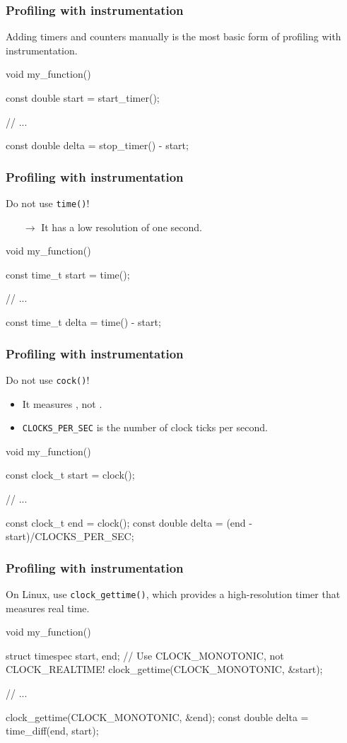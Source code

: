 \documentclass[12pt,t]{beamer}
\let\emph\relax %
\newcommand{\conclude}[1]{%
  \begin{itemize}
    \item[$\rightarrow$]#1
  \end{itemize}
}
\begin{document}
  \begin{frame}[fragile]
    \frametitle{Profiling with instrumentation}

    Adding timers and counters manually is the most basic form of profiling with instrumentation.

    \begin{code}
void my_function()
{
  const double start = start_timer();

  // ...

  const double delta = stop_timer() - start;
}
    \end{code}
  \end{frame}

  \begin{frame}[fragile]
    \frametitle{Profiling with instrumentation}

    Do not use \texttt{time()}!
    \conclude{It has a low resolution of one second.}

    \begin{code}
void my_function()
{
  const time_t start = time();

  // ...

  const time_t delta = time() - start;
}
    \end{code}
  \end{frame}

  \begin{frame}[fragile]
    \frametitle{Profiling with instrumentation}

    Do not use \texttt{cock()}!
    \begin{itemize}
      \item It measures \emph{CPU time}, not \emph{elapsed time}.
      \item \texttt{CLOCKS\_PER\_SEC} is \emph{not} the number of clock ticks per second.
    \end{itemize}

    \begin{code}
void my_function()
{
  const clock_t start = clock();

  // ...

  const clock_t end = clock();
  const double delta = (end - start)/CLOCKS_PER_SEC;
}
    \end{code}
  \end{frame}

  \begin{frame}[fragile]
    \frametitle{Profiling with instrumentation}

    On Linux, use \texttt{clock\_gettime()}, which provides a high-resolution timer that measures real time.

    \begin{code}
void my_function()
{
  struct timespec start, end;
  // Use CLOCK_MONOTONIC, not CLOCK_REALTIME!
  clock_gettime(CLOCK_MONOTONIC, &start);

  // ...

  clock_gettime(CLOCK_MONOTONIC, &end);
  const double delta = time_diff(end, start);
}
    \end{code}
  \end{frame}
\end{document}
